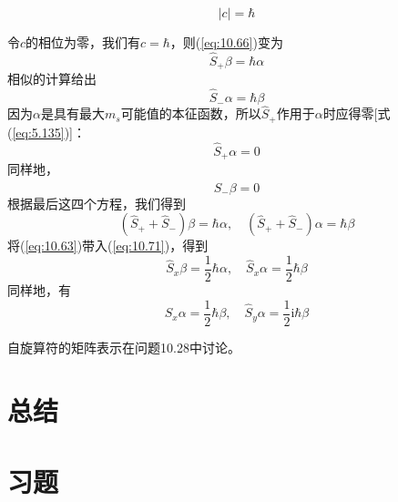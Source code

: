     \begin{equation*}
        \left|c\right| = \hbar
    \end{equation*}
    
    令$c$的相位为零，我们有$c = \hbar$，则(\ref{eq:10.66})变为
    \begin{equation}
        \hat{S}_+ \beta = \hbar \alpha
        \label{eq:10.69}
    \end{equation}
    相似的计算给出
    \begin{equation}
        \hat{S}_- \alpha = \hbar \beta
        \label{eq:10.70}
    \end{equation}
    因为$\alpha$是具有最大$m_s$可能值的本征函数，所以$\hat{S}_+$作用于$\alpha$时应得零[式(\ref{eq:5.135})]：
    \begin{equation*}
        \hat{S}_+ \alpha = 0
    \end{equation*}
    同样地，
    \begin{equation*}
        \hat{S}_- \beta = 0
    \end{equation*}
    根据最后这四个方程，我们得到
    \begin{equation}
        \left(\hat{S}_+ + \hat{S}_-\right)\beta = \hbar \alpha, \quad \left(\hat{S}_+ + \hat{S}_-\right)\alpha = \hbar \beta
        \label{eq:10.71}
    \end{equation}
    将(\ref{eq:10.63})带入(\ref{eq:10.71})，得到
    \begin{equation}
        \hat{S}_x \beta = \frac{1}{2}\hbar \alpha, \quad \hat{S}_x \alpha = \frac{1}{2}\hbar \beta
        \label{eq:10.72}
    \end{equation}
    同样地，有
    \begin{equation}
        \hat{S}_x \alpha = \frac{1}{2}\hbar \beta, \quad \hat{S}_y \alpha = \frac{1}{2}\mathrm{i}\hbar \beta
        \label{eq:10.73}
    \end{equation}
    
    自旋算符的矩阵表示在问题10.28中讨论。

\section*{总结}

\section*{习题}